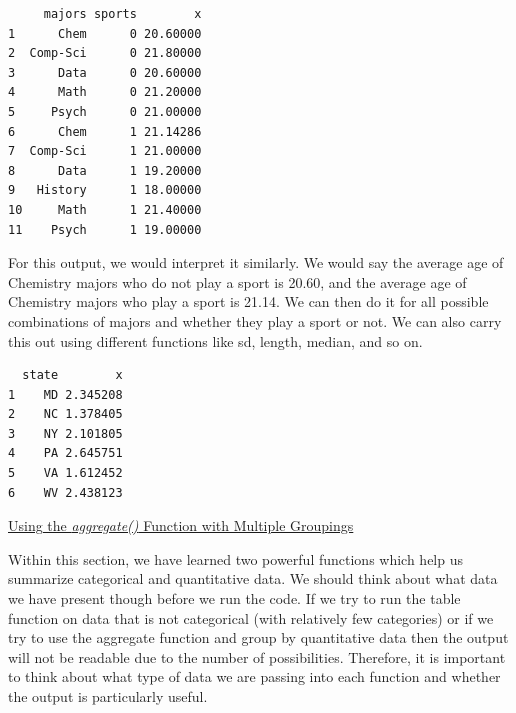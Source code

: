 \documentclass[
  letterpaper,
  DIV=11,
  numbers=noendperiod]{scrreprt}
\newenvironment{Shaded}{\begin{snugshade}}{\end{snugshade}}
\newcommand{\AttributeTok}[1]{\textcolor[rgb]{0.40,0.45,0.13}{#1}}
\newcommand{\FunctionTok}[1]{\textcolor[rgb]{0.28,0.35,0.67}{#1}}
\newcommand{\NormalTok}[1]{\textcolor[rgb]{0.00,0.23,0.31}{#1}}
\newcommand{\SpecialCharTok}[1]{\textcolor[rgb]{0.37,0.37,0.37}{#1}}
\begin{document}
\begin{verbatim}
     majors sports        x
1      Chem      0 20.60000
2  Comp-Sci      0 21.80000
3      Data      0 20.60000
4      Math      0 21.20000
5     Psych      0 21.00000
6      Chem      1 21.14286
7  Comp-Sci      1 21.00000
8      Data      1 19.20000
9   History      1 18.00000
10     Math      1 21.40000
11    Psych      1 19.00000
\end{verbatim}

For this output, we would interpret it similarly. We would say the
average age of Chemistry majors who do not play a sport is 20.60, and
the average age of Chemistry majors who play a sport is 21.14. We can
then do it for all possible combinations of majors and whether they play
a sport or not. We can also carry this out using different functions
like sd, length, median, and so on.

\begin{Shaded}
\end{Shaded}

\begin{verbatim}
  state        x
1    MD 2.345208
2    NC 1.378405
3    NY 2.101805
4    PA 2.645751
5    VA 1.612452
6    WV 2.438123
\end{verbatim}

\begin{watch}{}{}
    \href{https://youtu.be/OsadIjZEIR0}{Using the \textit{aggregate()} Function with Multiple Groupings}
\end{watch}

Within this section, we have learned two powerful functions which help
us summarize categorical and quantitative data. We should think about
what data we have present though before we run the code. If we try to
run the table function on data that is not categorical (with relatively
few categories) or if we try to use the aggregate function and group by
quantitative data then the output will not be readable due to the number
of possibilities. Therefore, it is important to think about what type of
data we are passing into each function and whether the output is
particularly useful.

\end{document}
